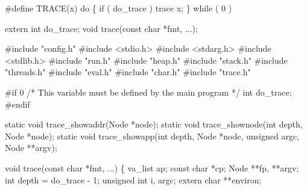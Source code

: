 \nwenddocs{}\endmoddef\nwstartdeflinemarkup\nwenddeflinemarkup
#define TRACE(x) do \{ if ( do_trace ) trace x; \} while ( 0 )

extern int do_trace;
void trace(const char *fmt, ...);

\nwendcode{}\nwdocspar
\nwenddocs{}\endmoddef\nwstartdeflinemarkup\nwenddeflinemarkup
#include "config.h"
#include <stdio.h>
#include <stdarg.h>
#include <stdlib.h>
#include "run.h"
#include "heap.h"
#include "stack.h"
#include "threads.h"
#include "eval.h"
#include "char.h"
#include "trace.h"

#if 0
/* This variable must be defined by the main program */
int do_trace;
#endif

static void trace_showaddr(Node *node);
static void trace_shownode(int depth, Node *node);
static void trace_showapp(int depth, Node *node, unsigned argc, Node **argv);

void
trace(const char *fmt, ...)
\{
    va_list      ap;
    const char   *cp;
    Node         **fp, **argv;
    int          depth = do_trace - 1;
    unsigned int i, argc;
    extern char  **environ;

